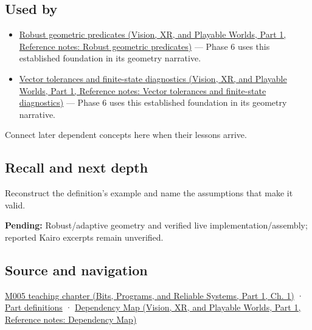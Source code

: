 \subsection{Used by}\label{appendix-5aef4f13483a-used-by}

\hypertarget{appendix-5aef4f13483a-used-by}{}

\begin{itemize}
\tightlist
\item
  \href{../07-Vision-XR-and-Playable-Worlds-P01/main.pdf\#appendix-341296fb3f64}{Robust geometric predicates (Vision, XR, and Playable Worlds, Part 1, Reference notes: Robust geometric predicates)} --- Phase 6 uses this established foundation in its geometry narrative.
\item
  \href{../07-Vision-XR-and-Playable-Worlds-P01/main.pdf\#appendix-b5b83329215b}{Vector tolerances and finite-state diagnostics (Vision, XR, and Playable Worlds, Part 1, Reference notes: Vector tolerances and finite-state diagnostics)} --- Phase 6 uses this established foundation in its geometry narrative.
\end{itemize}

Connect later dependent concepts here when their lessons arrive.

\subsection{Recall and next depth}\label{appendix-5aef4f13483a-recall-and-next-depth}

\hypertarget{appendix-5aef4f13483a-recall-and-next-depth}{}

Reconstruct the definition's example and name the assumptions that make it valid.

\textbf{Pending:} Robust/adaptive geometry and verified live implementation/assembly; reported Kairo excerpts remain unverified.

\subsection{Source and navigation}\label{appendix-5aef4f13483a-source-and-navigation}

\hypertarget{appendix-5aef4f13483a-source-and-navigation}{}

\href{../01-Bits-Programs-and-Reliable-Systems-P01/main.pdf\#01-foundations-i-ch001-when-arithmetic-meets-uncertainty}{M005 teaching chapter (Bits, Programs, and Reliable Systems, Part 1, Ch. 1)} · \hyperref[appendix-fd090d982a15-m005---parts-77-88]{Part definitions} · \href{../07-Vision-XR-and-Playable-Worlds-P01/main.pdf\#appendix-4ad47bdd269a}{Dependency Map (Vision, XR, and Playable Worlds, Part 1, Reference notes: Dependency Map)}
